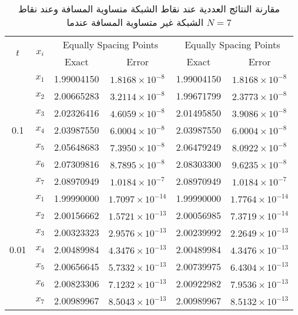 \begin{example}
	
	\begin{table}[ht]
		\renewcommand{\arraystretch}{1.5}
		\centering
		\begin{english}
\begin{tabular}{|c|c|c|c|c|c|}
			\hline
			\multirow{2}{*}{\( t \)} & \multirow{2}{*}{\( x_i \)} & \multicolumn{2}{c|}{Equally Spacing Points} & \multicolumn{2}{c|}{Equally Spacing Points} \\
			\cline{3-6}
			& & Exact & Error & Exact & Error \\
			\hline
			\multirow{7}{*}{0.1} & \( x_1 \) & 1.99004150 & \( 1.8168 \times 10^{-8} \) & 1.99004150 & \( 1.8168 \times 10^{-8} \) \\
			& \( x_2 \) & 2.00665283 & \( 3.2114 \times 10^{-8} \) & 1.99671799 & \( 2.3773 \times 10^{-8} \) \\
			& \( x_3 \) & 2.02326416 & \( 4.6059 \times 10^{-8} \) & 2.01495850 & \( 3.9086 \times 10^{-8} \) \\
			& \( x_4 \) & 2.03987550 & \( 6.0004 \times 10^{-8} \) & 2.03987550 & \( 6.0004 \times 10^{-8} \) \\
			& \( x_5 \) & 2.05648683 & \( 7.3950 \times 10^{-8} \) & 2.06479249 & \( 8.0922 \times 10^{-8} \) \\
			& \( x_6 \) & 2.07309816 & \( 8.7895 \times 10^{-8} \) & 2.08303300 & \( 9.6235 \times 10^{-8} \) \\
			& \( x_7 \) & 2.08970949 & \( 1.0184 \times 10^{-7} \) & 2.08970949 & \( 1.0184 \times 10^{-7} \) \\
			\hline
			\multirow{7}{*}{0.01} & \( x_1 \) & 1.99990000 & \( 1.7097 \times 10^{-14} \) & 1.99990000 & \( 1.7764 \times 10^{-14} \) \\
			& \( x_2 \) & 2.00156662 & \( 1.5721 \times 10^{-13} \) & 2.00056985 & \( 7.3719 \times 10^{-14} \) \\
			& \( x_3 \) & 2.00323323 & \( 2.9576 \times 10^{-13} \) & 2.00239992 & \( 2.2649 \times 10^{-13} \) \\
			& \( x_4 \) & 2.00489984 & \( 4.3476 \times 10^{-13} \) & 2.00489984 & \( 4.3476 \times 10^{-13} \) \\
			& \( x_5 \) & 2.00656645 & \( 5.7332 \times 10^{-13} \) & 2.00739975 & \( 6.4304 \times 10^{-13} \) \\
			& \( x_6 \) & 2.00823306 & \( 7.1232 \times 10^{-13} \) & 2.00922982 & \( 7.9536 \times 10^{-13} \) \\
			& \( x_7 \) & 2.00989967 & \( 8.5043 \times 10^{-13} \) & 2.00989967 & \( 8.5132 \times 10^{-13} \) \\
			\hline
		\end{tabular}
\end{english}
	\caption{\centering مقارنة النتائج العددية عند نقاط الشبكة متساوية المسافة وعند نقاط الشبكة غير متساوية المسافة عندما $N=7$}
\label{tab:secondN7}
\end{table}


\end{example}
